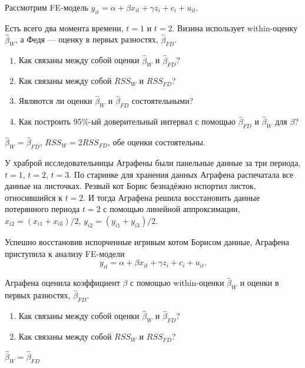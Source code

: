 \begin{problem}
Рассмотрим FE-модель $y_{it} = \alpha + \beta x_{it} + \gamma z_i + c_i + u_{it}$.

Есть всего два момента времени, $t=1$ и $t=2$. Визина использует within-оценку $\hat \beta_{W}$,
а Федя — оценку в первых разностях, $\hat \beta_{FD}$.

\begin{enumerate}
\item Как связаны между собой оценки $\hat \beta_W$ и $\hat \beta_{FD}$?
\item Как связаны между собой $RSS_W$ и $RSS_{FD}$?
\item Являются ли оценки $\hat\beta_W$ и $\hat\beta_{FD}$ состоятельными?
\item Как построить 95\%-ый доверительный интервал с помощью $\hat\beta_{FD}$ и $\hat\beta_W$ для $\beta$?
\end{enumerate}


\begin{sol}
$\hat\beta_W = \hat\beta_{FD}$, $RSS_W = 2RSS_{FD}$, обе оценки состоятельны.
\end{sol}
\end{problem}

\begin{problem}
У храброй исследовательницы Аграфены были панельные данные за три периода, $t=1$, $t=2$, $t=3$.
По старинке для хранения данных Аграфена распечатала все данные на листочках.
Резвый кот Борис безнадёжно испортил листок, относившийся к $t=2$. И тогда Аграфена
решила восстановить данные потерянного периода $t=2$ с помощью линейной аппроксимации, $x_{i2} = (x_{i1} + x_{i3})/2$,
$y_{i2} = (y_{i1} + y_{i3})/2$.

Успешно восстановив испорченные игривым котом Борисом данные, Аграфена приступила к анализу FE-модели
\[
y_{it} = \alpha + \beta x_{it} + \gamma z_i + c_i + u_{it}.
\]

Аграфена оценила коэффициент $\beta$ с помощью within-оценки $\hat\beta_{W}$ и
оценки в первых разностях, $\hat\beta_{FD}$.

\begin{enumerate}
\item Как связаны между собой оценки $\hat \beta_W$ и $\hat \beta_{FD}$?
\item Как связаны между собой $RSS_W$ и $RSS_{FD}$?
\end{enumerate}

\begin{sol}
    $\hat\beta_W = \hat\beta_{FD}$
\end{sol}
\end{problem}



